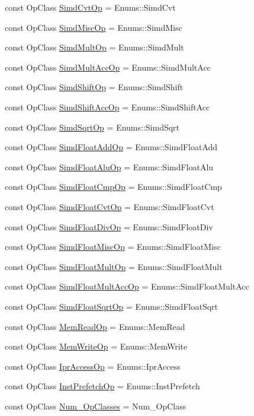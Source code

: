 \begin{DoxyCompactItemize}
const OpClass \hyperlink{op__class_8hh_a6c7a22b0557b5dd725f3629deb4b14cf}{SimdCvtOp} = Enums::SimdCvt
\item 
const OpClass \hyperlink{op__class_8hh_ae09ebfb90b2ddeeac91e32bf54b3519a}{SimdMiscOp} = Enums::SimdMisc
\item 
const OpClass \hyperlink{op__class_8hh_a9d11ad4c2cae79af98ff46cdfc575b18}{SimdMultOp} = Enums::SimdMult
\item 
const OpClass \hyperlink{op__class_8hh_a4c479e9bffd76c1d55b04744fe786e66}{SimdMultAccOp} = Enums::SimdMultAcc
\item 
const OpClass \hyperlink{op__class_8hh_a0789375948983a38d919a22cb3c82d7e}{SimdShiftOp} = Enums::SimdShift
\item 
const OpClass \hyperlink{op__class_8hh_a64f736357e43435fbf25e0d442609800}{SimdShiftAccOp} = Enums::SimdShiftAcc
\item 
const OpClass \hyperlink{op__class_8hh_aa24fd42b50aa2f1c06226e51310c4a0c}{SimdSqrtOp} = Enums::SimdSqrt
\item 
const OpClass \hyperlink{op__class_8hh_af5d28e472a47193ce4cfab8dd3938d7a}{SimdFloatAddOp} = Enums::SimdFloatAdd
\item 
const OpClass \hyperlink{op__class_8hh_a8ca7b859c7e65be5c76e5e4266cce355}{SimdFloatAluOp} = Enums::SimdFloatAlu
\item 
const OpClass \hyperlink{op__class_8hh_afddfea9d9ae86b65f397398048b36c87}{SimdFloatCmpOp} = Enums::SimdFloatCmp
\item 
const OpClass \hyperlink{op__class_8hh_a8da273cd0cba9df164b189dc216b1d50}{SimdFloatCvtOp} = Enums::SimdFloatCvt
\item 
const OpClass \hyperlink{op__class_8hh_a3b9f6c8547a6db26f930c8ccbc6090c8}{SimdFloatDivOp} = Enums::SimdFloatDiv
\item 
const OpClass \hyperlink{op__class_8hh_ab275354d1f1f0f4fef21d3b14eeaed98}{SimdFloatMiscOp} = Enums::SimdFloatMisc
\item 
const OpClass \hyperlink{op__class_8hh_a00ad99c4a6c35f8c4d6ea15aee0d770d}{SimdFloatMultOp} = Enums::SimdFloatMult
\item 
const OpClass \hyperlink{op__class_8hh_a88b1ac8de22c537899fc9ec8ee39cd05}{SimdFloatMultAccOp} = Enums::SimdFloatMultAcc
\item 
const OpClass \hyperlink{op__class_8hh_a651924a5d79428b05017beb253576ad4}{SimdFloatSqrtOp} = Enums::SimdFloatSqrt
\item 
const OpClass \hyperlink{op__class_8hh_a35573d4080505e2c0ace9f443cddaeee}{MemReadOp} = Enums::MemRead
\item 
const OpClass \hyperlink{op__class_8hh_a2b93816d13467d4afd38a53c8c11d950}{MemWriteOp} = Enums::MemWrite
\item 
const OpClass \hyperlink{op__class_8hh_ac80bed777f628f12af60cdffceadde03}{IprAccessOp} = Enums::IprAccess
\item 
const OpClass \hyperlink{op__class_8hh_acd5b2cee21df7d0f0475c985c89da515}{InstPrefetchOp} = Enums::InstPrefetch
\item 
const OpClass \hyperlink{op__class_8hh_a5e0e351c8afca390ef0a05a7dbb68b1b}{Num\_\-OpClasses} = Num\_\-OpClass
\end{DoxyCompactItemize}


